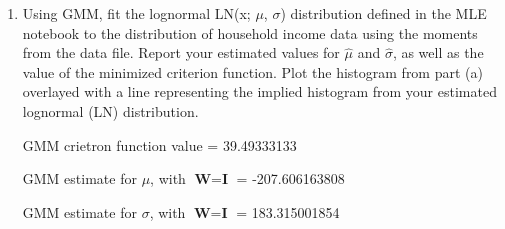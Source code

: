 \documentclass[letterpaper,12pt]{article}
\theoremstyle{definition}
\begin{document}
\begin{enumerate}
\begin{enumerate}
\item Using GMM, fit the lognormal LN(x; $\mu$, $\sigma$) distribution defined in the MLE notebook to the distribution of household income data using the moments from the data file. Report your estimated values for $\hat{\mu}$ and $\hat{\sigma}$, as well as the value of the minimized criterion function. Plot the histogram from part (a) overlayed with a line representing the implied histogram from your estimated lognormal (LN) distribution.
\par
\begin{figure}[H]\centering\captionsetup{width=4.0in}
\end{figure}
\par
GMM crietron function value = 39.49333133 \par
GMM estimate for $\mu$, with $\textbf{W} = \textbf{I}$ = -207.606163808 \par
GMM estimate for $\sigma$, with $\textbf{W} = \textbf{I}$ = 183.315001854 \par
\bigskip


\end{enumerate}
\end{enumerate}
\end{document}
